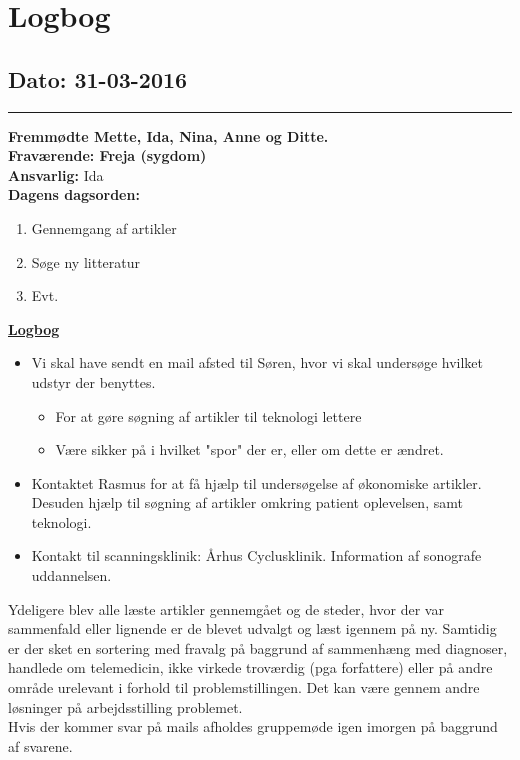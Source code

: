 \chapter{Logbog}
\section{Dato: 31-03-2016}
\hrule
\textbf{Fremmødte Mette, Ida, Nina, Anne og Ditte.} \\
\textbf{Fraværende: Freja (sygdom) } \\
\textbf{Ansvarlig:} Ida  \\
\textbf{Dagens dagsorden: }
\begin{enumerate}
	\item Gennemgang af artikler
	\item Søge ny litteratur
	\item Evt. 
\end{enumerate}

\underline{\textbf{Logbog}}
\begin{itemize}
\item Vi skal have sendt en mail afsted til Søren, hvor vi skal undersøge hvilket udstyr der benyttes.
\begin{itemize}
\item For at gøre søgning af artikler til teknologi lettere
\item Være sikker på i hvilket "spor" der er, eller om dette er ændret.
\end{itemize}
\item Kontaktet Rasmus for at få hjælp til undersøgelse af økonomiske artikler. Desuden hjælp til søgning af artikler omkring patient oplevelsen, samt teknologi. 
\item Kontakt til scanningsklinik: Århus Cyclusklinik. Information af sonografe uddannelsen. 
\end{itemize}

Ydeligere blev alle læste artikler gennemgået og de steder, hvor der var sammenfald eller lignende er de blevet udvalgt og læst igennem på ny. Samtidig er der sket en sortering med fravalg på baggrund af sammenhæng med diagnoser, handlede om telemedicin, ikke virkede troværdig (pga forfattere) eller på andre område urelevant i forhold til problemstillingen. Det kan være gennem andre løsninger på arbejdsstilling problemet.  \\
\newline
Hvis der kommer svar på mails afholdes gruppemøde igen imorgen på baggrund af svarene. 
\newpage